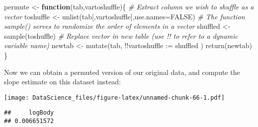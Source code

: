\documentclass[
]{book}
\newenvironment{Shaded}{\begin{snugshade}}{\end{snugshade}}
\newcommand{\AttributeTok}[1]{\textcolor[rgb]{0.77,0.63,0.00}{#1}}
\newcommand{\CommentTok}[1]{\textcolor[rgb]{0.56,0.35,0.01}{\textit{#1}}}
\newcommand{\ConstantTok}[1]{\textcolor[rgb]{0.00,0.00,0.00}{#1}}
\newcommand{\ControlFlowTok}[1]{\textcolor[rgb]{0.13,0.29,0.53}{\textbf{#1}}}
\newcommand{\DecValTok}[1]{\textcolor[rgb]{0.00,0.00,0.81}{#1}}
\newcommand{\FunctionTok}[1]{\textcolor[rgb]{0.00,0.00,0.00}{#1}}
\newcommand{\NormalTok}[1]{#1}
\newcommand{\OtherTok}[1]{\textcolor[rgb]{0.56,0.35,0.01}{#1}}
\newcommand{\SpecialCharTok}[1]{\textcolor[rgb]{0.00,0.00,0.00}{#1}}
\newcommand{\StringTok}[1]{\textcolor[rgb]{0.31,0.60,0.02}{#1}}
\begin{document}
\begin{Shaded}
\begin{Highlighting}[]
\NormalTok{permute }\OtherTok{\textless{}{-}} \ControlFlowTok{function}\NormalTok{(tab,vartoshuffle)\{}
  \CommentTok{\# Extract column we wish to shuffle as a vector}
\NormalTok{  toshuffle }\OtherTok{\textless{}{-}} \FunctionTok{unlist}\NormalTok{(tab[,vartoshuffle],}\AttributeTok{use.names=}\ConstantTok{FALSE}\NormalTok{)}
  \CommentTok{\# The function sample() serves to randomize the order of elements in a vector}
\NormalTok{  shuffled }\OtherTok{\textless{}{-}} \FunctionTok{sample}\NormalTok{(toshuffle)}
  \CommentTok{\# Replace vector in new table (use !! to refer to a dynamic variable name)}
\NormalTok{  newtab }\OtherTok{\textless{}{-}} \FunctionTok{mutate}\NormalTok{(tab, }\SpecialCharTok{!!}\AttributeTok{vartoshuffle :=}\NormalTok{ shuffled )}
  \FunctionTok{return}\NormalTok{(newtab)}
\NormalTok{\}}
\end{Highlighting}
\end{Shaded}

Now we can obtain a permuted version of our original data, and compute the slope estimate on this dataset instead:

\begin{Shaded}
\end{Shaded}

\texttt{[image: DataScience\_files/figure-latex/unnamed-chunk-66-1.pdf]}

\begin{Shaded}
\end{Shaded}

\begin{verbatim}
##     logBody 
## 0.006651572
\end{verbatim}
\end{document}
